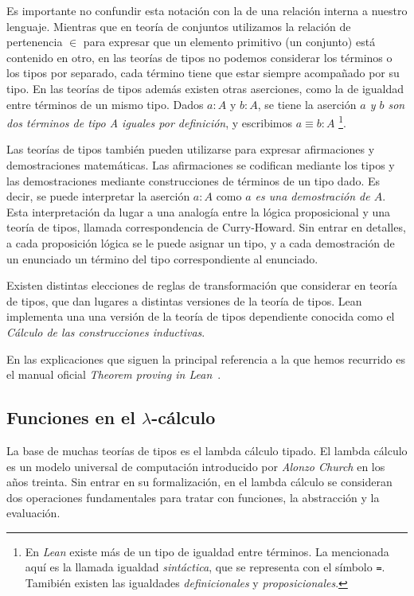 Es importante no confundir esta notación con la de una relación interna a
nuestro lenguaje. Mientras que en teoría de conjuntos utilizamos la relación de
pertenencia $\in$ para expresar que un elemento primitivo (un conjunto) está
contenido en otro, en las teorías de tipos no podemos considerar los términos o
los tipos por separado, cada término tiene que estar siempre acompañado por su
tipo. En las teorías de tipos además existen otras aserciones, como la de
igualdad entre términos de un mismo tipo. Dados $a:A$ y $b:A$, se tiene la
aserción \textit{$a$ y $b$ son dos términos de tipo A iguales por definición}, y
escribimos $a\equiv b : A$ \footnote{En \textit{Lean} existe más de un tipo de
	igualdad entre términos. La mencionada aquí es la llamada igualdad
	\textit{sintáctica}, que se representa con el símbolo \lstinline{=}. Tamibién
	existen las igualdades \textit{definicionales} y \textit{proposicionales}.}.

Las teorías de tipos también pueden utilizarse para expresar afirmaciones y
demostraciones matemáticas. Las afirmaciones se codifican mediante los tipos y
las demostraciones mediante construcciones de términos de un tipo dado. Es
decir, se puede interpretar la aserción $a : A$ como \textit{$a$ es una
	demostración de $A$}. Esta interpretación da lugar a una analogía entre la
lógica proposicional y una teoría de tipos, llamada correspondencia de
Curry-Howard. Sin entrar en detalles, a cada proposición lógica se le puede
asignar un tipo, y a cada demostración de un enunciado un término del tipo
correspondiente al enunciado.

Existen distintas elecciones de reglas de transformación que considerar en
teoría de tipos, que dan lugares a distintas versiones de la teoría de tipos.
Lean implementa una una versión de la teoría de tipos dependiente conocida como
el \textit{Cálculo de las construcciones inductivas}.

En las explicaciones que siguen la principal referencia a la que hemos recurrido
es el manual oficial \textit{Theorem proving in Lean}~\cite{avigadLeanTheoremProver}.

\subsection{Funciones en el $\lambda$-c\'{a}lculo}

La base de muchas teorías de tipos es el lambda cálculo tipado. El lambda
cálculo es un modelo universal de computación introducido por \textit{Alonzo
	Church} en los años treinta. Sin entrar en su formalización, en el lambda
cálculo se consideran dos operaciones fundamentales para tratar con funciones,
la abstracción y la evaluación.

